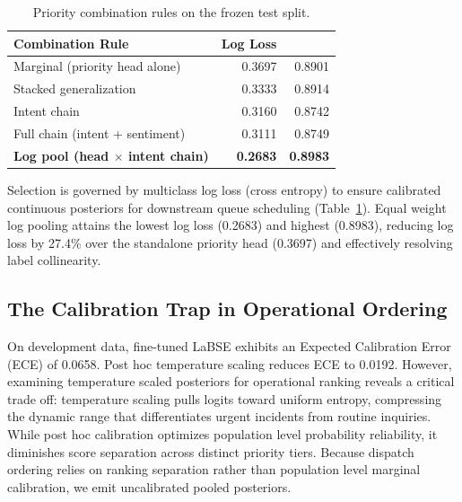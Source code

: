 \begin{table}[!tb]
\caption{Priority combination rules on the frozen test split.}
\label{tab:combination}
\centering
\footnotesize
\setlength{\tabcolsep}{4pt}
\begin{tabular}{@{}lrr@{}}
\toprule
Combination Rule & Log Loss & \macrof{} \\
\midrule
Marginal (priority head alone)    & 0.3697 & 0.8901 \\
Stacked generalization \cite{wolpert1992stacked} & 0.3333 & 0.8914 \\
Intent chain \cite{dembczynski2010pcc} & 0.3160 & 0.8742 \\
Full chain (intent + sentiment)   & 0.3111 & 0.8749 \\
\textbf{Log pool (head $\times$ intent chain)} & \textbf{0.2683} & \textbf{0.8983} \\
\bottomrule
\end{tabular}
\end{table}

Selection is governed by multiclass log loss (cross entropy) to ensure calibrated continuous posteriors for downstream queue scheduling (Table~\ref{tab:combination}). Equal weight log pooling attains the lowest log loss (0.2683) and highest \macrof{} (0.8983), reducing log loss by 27.4\% over the standalone priority head (0.3697) and effectively resolving label collinearity.

\subsection{The Calibration Trap in Operational Ordering}

On development data, fine-tuned LaBSE exhibits an Expected Calibration Error (ECE) of 0.0658. Post hoc temperature scaling \cite{guo2017calibration} reduces ECE to 0.0192. However, examining temperature scaled posteriors for operational ranking reveals a critical trade off: temperature scaling pulls logits toward uniform entropy, compressing the dynamic range that differentiates urgent incidents from routine inquiries. While post hoc calibration optimizes population level probability reliability, it diminishes score separation across distinct priority tiers. Because dispatch ordering relies on ranking separation rather than population level marginal calibration, we emit uncalibrated pooled posteriors.
